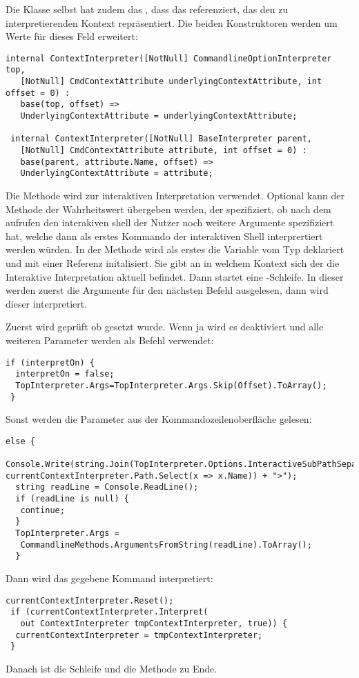 Die  Klasse selbst hat zudem das , dass das  referenziert, das den zu interpretierenden Kontext repräsentiert.
Die beiden Konstruktoren werden um Werte für dieses Feld erweitert:
\begin{lstlisting}[language={[Sharp]C}, title=Konstruktoren der ContextInterpreter Klasse]
 internal ContextInterpreter([NotNull] CommandlineOptionInterpreter top,
   [NotNull] CmdContextAttribute underlyingContextAttribute, int offset = 0) :
   base(top, offset) =>
   UnderlyingContextAttribute = underlyingContextAttribute;

 internal ContextInterpreter([NotNull] BaseInterpreter parent,
   [NotNull] CmdContextAttribute attribute, int offset = 0) :
   base(parent, attribute.Name, offset) =>
   UnderlyingContextAttribute = attribute;
\end{lstlisting}
Die  Methode wird zur interaktiven Interpretation verwendet.
Optional kann der Methode der Wahrheitswert  übergeben werden, der spezifiziert,
ob nach dem aufrufen den interakiven shell der Nutzer noch weitere Argumente spezifiziert hat, welche dann als erstes Kommando der interaktiven Shell interprertiert werden würden.
In der Methode wird als erstes die  Variable vom Typ  deklariert und mit einer  Referenz initalisiert.
Sie gibt an in welchem Kontext sich der die Interaktive Interpretation aktuell befindet.
Dann startet eine -Schleife.
In dieser werden zuerst die Argumente für den nächsten Befehl ausgelesen, dann wird dieser interpretiert.

Zuerst wird geprüft ob  gesetzt wurde.
Wenn ja wird es deaktiviert und alle weiteren Parameter werden als Befehl verwendet:
\begin{lstlisting}[title=""]
 if (interpretOn) {
  interpretOn = false;
  TopInterpreter.Args=TopInterpreter.Args.Skip(Offset).ToArray();
 }
\end{lstlisting}
Sonst werden die Parameter aus der Kommandozeilenoberfläche gelesen:
\begin{lstlisting}[title=""]
 else {
  Console.Write(string.Join(TopInterpreter.Options.InteractiveSubPathSeparator, currentContextInterpreter.Path.Select(x => x.Name)) + ">");
  string readLine = Console.ReadLine();
  if (readLine is null) {
   continue;
  }
  TopInterpreter.Args =
   CommandlineMethods.ArgumentsFromString(readLine).ToArray();
  } \end{lstlisting}
Dann wird das gegebene Kommand interpretiert:
\begin{lstlisting}[title=""]
 currentContextInterpreter.Reset();
 if (currentContextInterpreter.Interpret(
   out ContextInterpreter tmpContextInterpreter, true)) {
  currentContextInterpreter = tmpContextInterpreter;
 }
\end{lstlisting}
Danach ist die Schleife und die Methode zu Ende.

